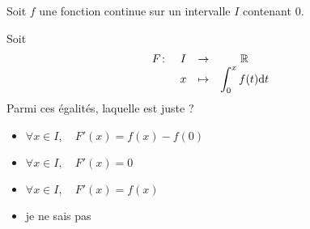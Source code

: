 \begin{clickers}\label{QEL:derivee_borne_sup_integrale}
Soit \(f\) une fonction continue sur un intervalle \(I\) contenant \(0\). 

Soit \[ \begin{array}[t]{cccc} 
         F \colon & I & \rightarrow & \mathbb{R} \\
		  & x & \mapsto	    & \displaystyle \int_0^x f(t) \mathrm{d}t
        \end{array}\]
Parmi ces égalités, laquelle est juste ?
 \begin{itemize}
  \item \(\forall x \in I, \quad F'(x)=f(x)-f(0)\)
  \item \(\forall x \in I, \quad F'(x)=0\)
  \item \(\forall x \in I, \quad F'(x)=f(x)\)
  \item je ne sais pas
 \end{itemize}
\end{clickers}
